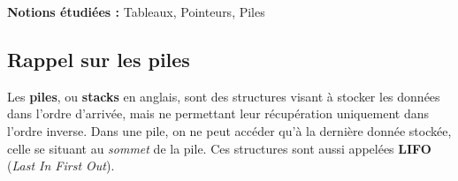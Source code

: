 \newcommand{\defaultparindent}{\parindent}
\setlength{\parindent}{0pt}				%




\textbf{Notions étudiées :} Tableaux, Pointeurs, Piles\\


\subsection{Rappel sur les piles}

\bigskip

Les \textbf{piles}, ou \textbf{stacks} en anglais, sont des structures visant à stocker les données dans l'ordre d'arrivée, mais ne permettant leur récupération uniquement dans l'ordre inverse.
Dans une pile, on ne peut accéder qu'à la dernière donnée stockée, celle se situant au \textit{sommet} de la pile.
Ces structures sont aussi appelées \textbf{LIFO} (\textit{Last In First Out}).\\


